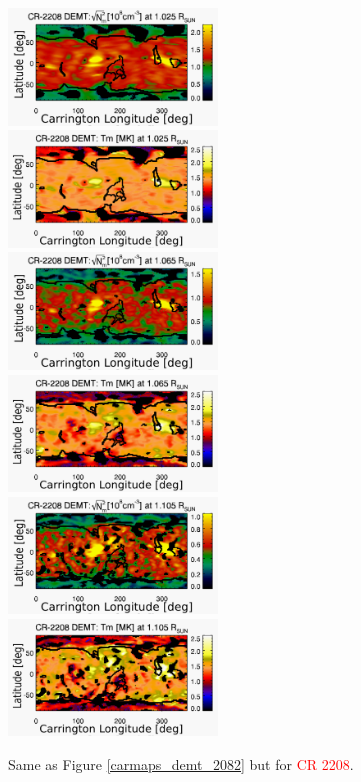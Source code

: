 \documentclass[namedreferences]{solarphysics}
\def\edit#1{\textcolor{Red}{#1}}
\begin{document}
\begin{article}
\begin{figure}[h!]
\begin{center}
\includegraphics[width=0.495\textwidth]{map_Ne_CR2208_DEMT-AIA_H1_L522_r3d_multistart2_1025_Rsun2.pdf}
\includegraphics[width=0.495\textwidth]{map_Tm_CR2208_DEMT-AIA_H1_L522_r3d_multistart2_1025_Rsun2.pdf}
\includegraphics[width=0.495\textwidth]{map_Ne_CR2208_DEMT-AIA_H1_L522_r3d_multistart2_1065_Rsun2.pdf}
\includegraphics[width=0.495\textwidth]{map_Tm_CR2208_DEMT-AIA_H1_L522_r3d_multistart2_1065_Rsun2.pdf}
\includegraphics[width=0.495\textwidth]{map_Ne_CR2208_DEMT-AIA_H1_L522_r3d_multistart2_1105_Rsun2.pdf}
\includegraphics[width=0.495\textwidth]{map_Tm_CR2208_DEMT-AIA_H1_L522_r3d_multistart2_1105_Rsun2.pdf}
\caption{Same as Figure \ref{carmaps_demt_2082} but for \edit{CR 2208}.}
\label{carmaps_demt_2208}
\end{center}
\end{figure}


\end{article}
\end{document}
